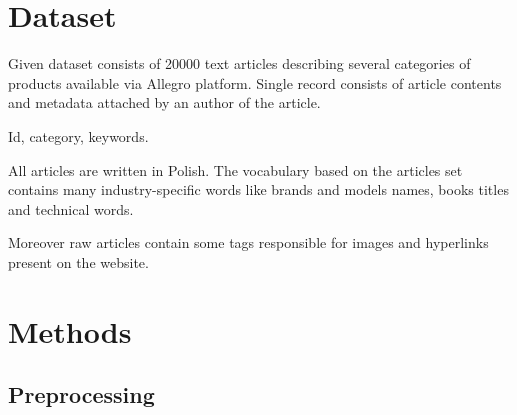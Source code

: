 \documentclass[twoside,twocolumn]{article}
\begin{document}
	\section{Dataset}
	
	Given dataset consists of 20000 text articles describing several categories of products available via Allegro platform. Single record consists of article contents and metadata attached by an author of the article.
	
	Id, category, keywords.
	
	All articles are written in Polish. The vocabulary based on the articles set contains many industry-specific words like brands and models names, books titles and technical words.
	
	Moreover raw articles contain some tags responsible for images and hyperlinks present on the website.
	
	
	
	\section{Methods}

	\subsection{Preprocessing}
	
\end{document}
